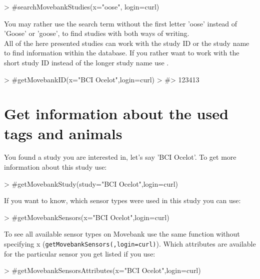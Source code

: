 \documentclass[article,nojss]{jss}
\newcommand{\fct}[1]{{\code{#1()}}}
\begin{document}
\begin{Schunk}
\begin{Sinput}
> #searchMovebankStudies(x="oose", login=curl)
\end{Sinput}
\end{Schunk}
You may rather use the search term without the first letter 'oose' instead of 'Goose' or 'goose', to find studies with both ways of writing. \\
All of the here presented studies can work with the study ID or the study name to find information within the database. If you rather want to work with the short study ID instead of the longer study name use \fct{getMovebankID}.

\begin{Schunk}
\begin{Sinput}
> #getMovebankID(x="BCI Ocelot",login=curl)
> #> 123413
\end{Sinput}
\end{Schunk}

\section*{Get information about the used tags and animals}
You found a study you are interested in, let's say 'BCI Ocelot'. To get more information about this study use:

\begin{Schunk}
\begin{Sinput}
> #getMovebankStudy(study="BCI Ocelot",login=curl)
\end{Sinput}
\end{Schunk}
If you want to know, which sensor types were used in this study you can use:

\begin{Schunk}
\begin{Sinput}
> #getMovebankSensors(x="BCI Ocelot",login=curl)
\end{Sinput}
\end{Schunk}

To see all available sensor types on Movebank use the same function without specifying x (\texttt{getMovebankSensors(,login=curl)}). Which attributes are available for the particular sensor you get listed if you use:

\begin{Schunk}
\begin{Sinput}
> #getMovebankSensorsAttributes(x="BCI Ocelot",login=curl)
\end{Sinput}
\end{Schunk}
\end{document}
